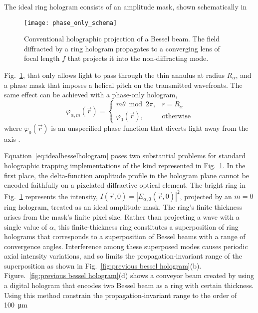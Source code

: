 The ideal ring hologram consists of an amplitude mask, shown
schematically in
\begin{figure}[t!]
  \centering
  \texttt{[image: phase\_only\_schema]}
  \caption{Conventional
    holographic projection of a Bessel beam.  The field diffracted
    by a ring hologram propagates to a converging lens of
    focal length $f$ that projects it into the non-diffracting mode.}
  \label{fig:phase_only_schema}
\end{figure}
Fig.~\ref{fig:phase_only_schema},
that only allows light to pass through the thin annulus at radius
$R_\alpha$, and a phase mask that imposes a helical pitch on the
transmitted wavefronts.
The same effect can be achieved with a
phase-only hologram,
\begin{equation}
  \label{eq:idealbesselhologram}
  \varphi_{\alpha,m}(\vec{r})
  =
  \begin{cases}
    m \theta \bmod 2 \pi, & r = R_\alpha \\
    \varphi_0(\vec{r}), & \text{otherwise}
  \end{cases}
\end{equation}
where $\varphi_0(\vec{r})$ is an unspecified
phase function that diverts light away from the
axis \cite{roichman06}.

Equation~\eqref{eq:idealbesselhologram}
poses two substantial problems for standard
holographic trapping implementations
of the kind represented in Fig.~\ref{fig:phase_only_schema}.
In the first place, the delta-function
amplitude profile in the hologram plane cannot be encoded
faithfully on a pixelated diffractive optical element.
The bright ring in Fig.~\ref{fig:phase_only_schema} represents
the intensity,
$I(\vec{r},0) = \left\vert  E_{\alpha,0}(\vec{r},0)\right\vert^2$,
projected by an $m = 0$ ring hologram, treated as an
ideal amplitude mask.
The ring's finite thickness arises from the mask's
finite pixel size.
Rather than projecting a wave with a single value of $\alpha$,
this finite-thickness ring constitutes a superposition of
ring holograms that corresponds to a
superposition of Bessel beams with
a range of convergence angles.
Interference among these superposed modes
causes periodic axial intensity variations,
and so limits the propagation-invariant
range of the superposition \cite{ruffner12a} as shown in Fig.~\ref{fig:previous bessel hologram}(b). Figure.~\ref{fig:previous bessel hologram}(d) shows a conveyor beam created by using a digital hologram that encodes two Bessel beam as a ring with certain thickness. Using this method constrain the propagation-invariant range to the order of \SI{100}{\um}


